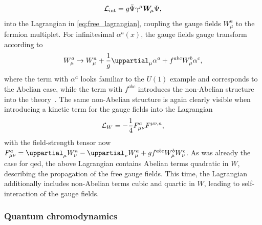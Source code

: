\begin{equation}
	\Lagr_\mathrm{int} = g\bar{\Psi}\gamma^\mu\makemebold{W}_{\hspace{-0.25em}\mu}\Psi,
\end{equation}
into the Lagrangian in \cref{eq:free_lagrangian}, coupling the gauge fields $W^a_\mu$ to the fermion multiplet. For infinitesimal $\alpha^a(x)$, the gauge fields gauge transform according to
\begin{equation}
	W_\mu^a \rightarrow W_\mu^a + \frac{1}{g}\uppartial_\mu\alpha^a + f^{abc} W_\mu^b \alpha^c,
\end{equation}
where the term with $\alpha^a$ looks familiar to the $U(1)$ example and corresponds to the Abelian case, while the term with $f^{abc}$ introduces the non-Abelian structure into the theory~\cite{Brock:1354959}. The same non-Abelian structure is again clearly visible when introducing a kinetic term for the gauge fields into the Lagrangian
\begin{equation}
	\mathcal{L}_{W} = -\frac{1}{4} F^a_{\mu\nu} F^{\mu\nu,a},
\end{equation} 
with the field-strength tensor now $F^a_{\mu\nu} = \uppartial_\mu W^a_\nu - \uppartial_\nu W^a_\mu + gf^{abc}W^b_\mu W^c_\nu$. As was already the case for \gls{qed}, the above Lagrangian contains Abelian terms quadratic in $W$, describing the propagation of the free gauge fields. This time, the Lagrangian additionally includes non-Abelian terms cubic and quartic in $W$, leading to self-interaction of the gauge fields.

\subsubsection{Quantum chromodynamics}

